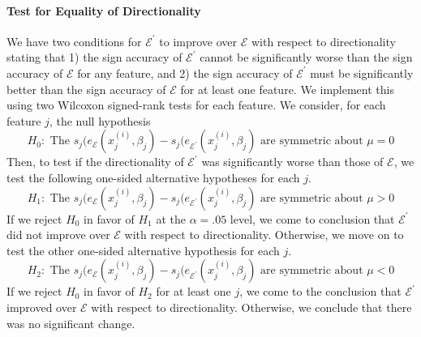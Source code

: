 \documentclass[mnsc,blindrev]{informs3}
\newcommand{\mE}{\mathcal{E}}
\begin{document}
\paragraph{Test for Equality of Directionality}        We have two conditions for $\mE^\prime$ to improve over $\mE$ with respect to directionality stating that 1) the sign accuracy of $\mE^\prime$ cannot be significantly worse than the sign accuracy of $\mE$ for any feature, and 2) the sign accuracy of $\mE^\prime$ must be significantly better than the sign accuracy of $\mE$ for at least one feature. We implement this using two Wilcoxon signed-rank tests for each feature. We consider, for each feature $j$, the null hypothesis
        \begin{equation*}
            H_0: \text{ The } s_j(e_\mE(x_j^{(i)},\beta_j) - s_j(e_{\mE^\prime}(x_j^{(i)},\beta_j) \text{ are symmetric about } \mu = 0
        \end{equation*}
        Then, to test if the directionality of $\mE^\prime$ was significantly worse than those of $\mE$, we test the following one-sided alternative hypotheses for each $j$.
        \begin{equation*}
            H_1: \text{ The } s_j(e_\mE(x_j^{(i)},\beta_j) - s_j(e_{\mE^\prime}(x_j^{(i)},\beta_j) \text{ are symmetric about } \mu > 0
        \end{equation*}
        If we reject $H_0$ in favor of $H_1$ at the $\alpha=.05$ level, we come to conclusion that $\mE^{\prime}$ did not improve over $\mE$ with respect to directionality. Otherwise, we move on to test the other one-sided alternative hypothesis for each $j$.
        \begin{equation*}
            H_2: \text{ The }  s_j(e_\mE(x_j^{(i)},\beta_j) - s_j(e_{\mE^\prime}(x_j^{(i)},\beta_j) \text{ are symmetric about } \mu < 0
        \end{equation*}
        If we reject $H_0$ in favor of $H_2$ for at least one $j$, we come to the conclusion that $\mE^{\prime}$ improved over $\mE$ with respect to directionality. Otherwise, we conclude that there was no significant change. 
        
\end{document}
